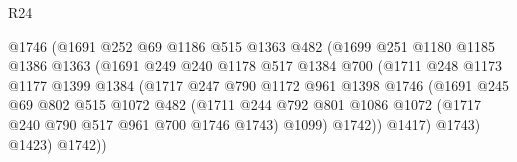 \begin{lexlean}{R24}
\begin{coremodule}
                                  @1746
                                  (@1691
                                    @252
                                    @69
                                    @1186
                                    @515
                                    @1363
                                    @482
                                    (@1699
                                      @251
                                      @1180
                                      @1185
                                      @1386
                                      @1363
                                      (@1691
                                        @249
                                        @240
                                        @1178
                                        @517
                                        @1384
                                        @700
                                        (@1711
                                          @248
                                          @1173
                                          @1177
                                          @1399
                                          @1384
                                          (@1717
                                            @247
                                            @790
                                            @1172
                                            @961
                                            @1398
                                            @1746
                                            (@1691
                                              @245
                                              @69
                                              @802
                                              @515
                                              @1072
                                              @482
                                              (@1711
                                                @244
                                                @792
                                                @801
                                                @1086
                                                @1072
                                                (@1717 @240 @790 @517 @961 @700 @1746 @1743)
                                                @1099)
                                              @1742))
                                          @1417)
                                        @1743)
                                      @1423)
                                    @1742))

\end{coremodule}
\end{lexlean}
